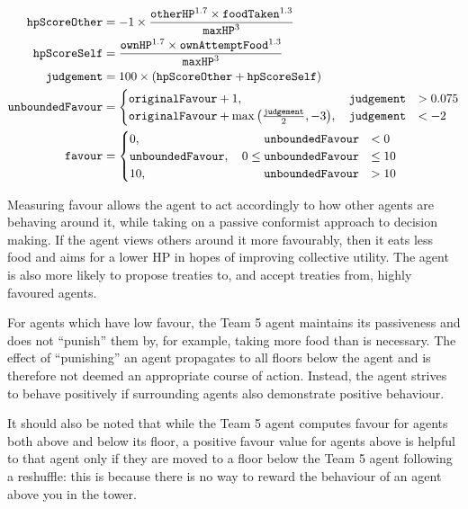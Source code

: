 \begin{align*}
    \texttt{hpScoreOther} &= -1 \times \frac{\texttt{otherHP}^{1.7} \times \texttt{foodTaken}^{1.3}}{\texttt{maxHP}^3}\\
    \texttt{hpScoreSelf} &= \frac{\texttt{ownHP}^{1.7}\times\texttt{ownAttemptFood}^{1.3}}{\texttt{maxHP}^3}\\
    \texttt{judgement} &= 100 \times (\texttt{hpScoreOther} + \texttt{hpScoreSelf})\\
    \texttt{unboundedFavour} &= \begin{cases}
        \texttt{originalFavour} + 1, \quad\hfill \texttt{judgement} &> 0.075\\
        \texttt{originalFavour} + \max{\left(\frac{\texttt{judgement}}{2}, -3\right)}, \quad\hfill\texttt{judgement} &< -2
    \end{cases}\\
    \texttt{favour} &= \begin{cases}
        0, \quad\hfill \texttt{unboundedFavour} &< 0\\
        \texttt{unboundedFavour}, \quad 0 \leq \texttt{unboundedFavour} &\leq 10\\
        10, \quad\hfill \texttt{unboundedFavour} &> 10
    \end{cases}\\
\end{align*}

Measuring favour allows the agent to act accordingly to how other agents are behaving around it, while taking on a passive conformist approach to decision making. If the agent views others around it more favourably, then it eats less food and aims for a lower HP in hopes of improving collective utility. The agent is also more likely to propose treaties to, and accept treaties from, highly favoured agents.

For agents which have low favour, the Team 5 agent maintains its passiveness and does not ``punish'' them by, for example, taking more food than is necessary. The effect of ``punishing'' an agent propagates to all floors below the agent and is therefore not deemed an appropriate course of action. Instead, the agent strives to behave positively if surrounding agents also demonstrate positive behaviour.

It should also be noted that while the Team 5 agent computes favour for agents both above and below its floor, a positive favour value for agents above is helpful to that agent only if they are moved to a floor below the Team 5 agent following a reshuffle: this is because there is no way to reward the behaviour of an agent above you in the tower.

